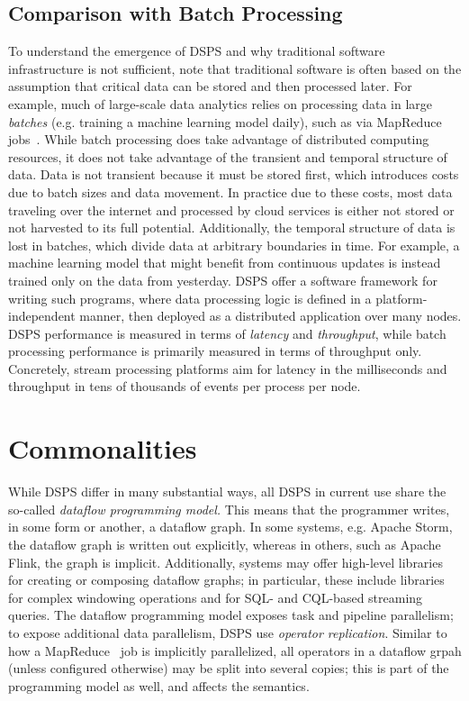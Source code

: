 \subsection{Comparison with Batch Processing}

To understand the emergence of DSPS and why traditional software infrastructure
is not sufficient, note that traditional software
is often based on the assumption that
critical data can be stored and then processed later.
For example,
much of large-scale data analytics relies on processing data in large
\emph{batches} (e.g. training a machine learning model daily),
such as via MapReduce jobs~\cite{dean2008mapreduce}.
While batch processing
does take advantage of distributed computing resources,
it does not take advantage of the transient and temporal structure of data.
Data is not transient because it must be stored first,
which introduces costs due to batch sizes and data movement.
In practice due to these costs, most data traveling over the internet
and processed by cloud services is either not stored or not harvested to its full potential.
Additionally, the temporal structure of data is lost in batches, which divide
data at arbitrary boundaries in time.
For example, a machine learning model that might benefit from continuous updates is instead trained only on the data from yesterday.
DSPS offer a software framework for writing such programs, where data processing logic is defined in a platform-independent manner,
then deployed as a distributed application over many nodes.
DSPS performance is measured in terms of \emph{latency} and \emph{throughput},
while batch processing performance is primarily measured in terms of throughput only.
Concretely, stream processing platforms aim for latency in the milliseconds and throughput in tens of thousands of events per process per node.

\section{Commonalities}

While DSPS differ in many substantial ways, all DSPS in current use share the so-called \emph{dataflow programming model.} This means that the programmer writes, in some form or another, a dataflow graph. In some systems, e.g. Apache Storm, the dataflow graph is written out explicitly, whereas in others, such as Apache Flink, the graph is implicit. Additionally, systems may offer high-level libraries for creating or composing dataflow graphs; in particular, these include libraries for complex windowing operations and for SQL- and CQL-based streaming queries.
The dataflow programming model exposes task and pipeline parallelism; to expose additional data parallelism, DSPS use \emph{operator replication}. Similar to how a MapReduce~\cite{dean2008mapreduce} job is implicitly parallelized, all operators in a dataflow grpah (unless configured otherwise) may be split into several copies; this is part of the programming model as well, and affects the semantics.

